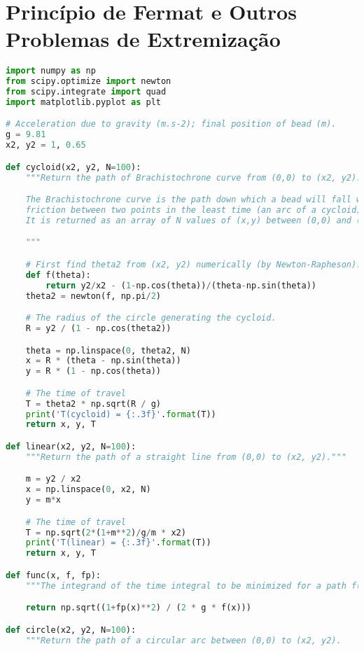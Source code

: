 \chapter{Princípio de Fermat e Outros Problemas de Extremização}

\begin{lstlisting}[language=Python, frame=lines, basicstyle=\footnotesize, caption={Tempo de Viagem na braquistócrona e em outras curvas}, label={lst:var1}]
import numpy as np
from scipy.optimize import newton
from scipy.integrate import quad
import matplotlib.pyplot as plt

# Acceleration due to gravity (m.s-2); final position of bead (m).
g = 9.81
x2, y2 = 1, 0.65

def cycloid(x2, y2, N=100):
    """Return the path of Brachistochrone curve from (0,0) to (x2, y2).

    The Brachistochrone curve is the path down which a bead will fall without
    friction between two points in the least time (an arc of a cycloid).
    It is returned as an array of N values of (x,y) between (0,0) and (x2,y2).

    """

    # First find theta2 from (x2, y2) numerically (by Newton-Rapheson).
    def f(theta):
        return y2/x2 - (1-np.cos(theta))/(theta-np.sin(theta))
    theta2 = newton(f, np.pi/2)

    # The radius of the circle generating the cycloid.
    R = y2 / (1 - np.cos(theta2))

    theta = np.linspace(0, theta2, N)
    x = R * (theta - np.sin(theta))
    y = R * (1 - np.cos(theta))

    # The time of travel
    T = theta2 * np.sqrt(R / g)
    print('T(cycloid) = {:.3f}'.format(T))
    return x, y, T

def linear(x2, y2, N=100):
    """Return the path of a straight line from (0,0) to (x2, y2)."""

    m = y2 / x2
    x = np.linspace(0, x2, N)
    y = m*x

    # The time of travel
    T = np.sqrt(2*(1+m**2)/g/m * x2)
    print('T(linear) = {:.3f}'.format(T))
    return x, y, T

def func(x, f, fp):
    """The integrand of the time integral to be minimized for a path f(x)."""

    return np.sqrt((1+fp(x)**2) / (2 * g * f(x)))

def circle(x2, y2, N=100):
    """Return the path of a circular arc between (0,0) to (x2, y2).


\end{lstlisting}
